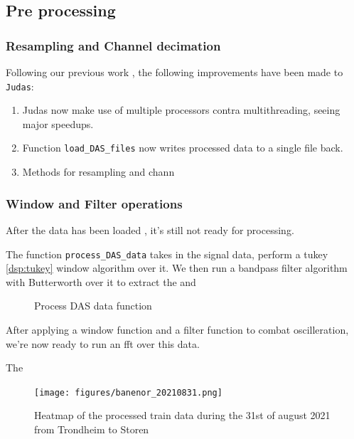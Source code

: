 \subsection{Pre processing}

\subsubsection{Resampling and Channel decimation}

Following our previous work \cite{projthesis}, the following improvements have been made to \texttt{Judas}: 

\begin{enumerate}
    \item Judas now make use of multiple processors contra multithreading, seeing major speedups.
    \item Function \texttt{load\_DAS\_files} now writes processed data to a single file back.
    \item Methods for resampling and chann
\end{enumerate}


\subsubsection{Window and Filter operations}

After the data has been loaded \cite{projthesis}, it's still not ready for processing. 

The function \lstinline|process_DAS_data| takes in the signal data, perform a tukey \ref{dsp:tukey} window algorithm over it. We then run a bandpass filter algorithm with Butterworth over it to extract the and 

\begin{figure}[h]
    \centering
    
    \caption{Process DAS data function}
    \label{fig:procdasdata}
\end{figure}


After applying a window function and a filter function to combat oscilleration, we're now ready to run an fft over this data. 


The 

\begin{figure}[h]
    \centering
    \texttt{[image: figures/banenor\_20210831.png]}
    \caption{Heatmap of the processed train data during the 31st of august 2021 from Trondheim to Storen}
    \label{fig:trdstrdas}
\end{figure}

